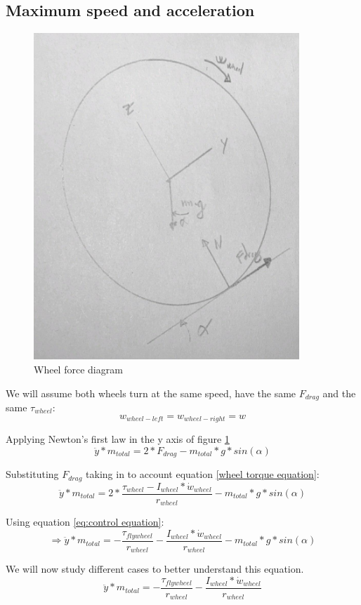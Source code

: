 \subsection{Maximum speed and acceleration}
\begin{figure}
	\centering
	\includegraphics[width=10cm]{img/wheel_diagram_drag.jpg}
	\caption{Wheel force diagram}
	\label{fig:Wheel forward force diagram}
\end{figure}
We will assume both wheels turn at the same speed, have the same $F_{drag}$ and the same $\tau_{wheel}$:
\[ w_{wheel-left} = w_{wheel-right} = w \]

Applying Newton's first law in the y axis of figure \ref{fig:Wheel forward force diagram}
\[\ddot{y}*m_{total} = 2 * F_{drag} - m_{total} * g * sin(\alpha)\]

Substituting $F_{drag}$ taking in to account equation \ref{wheel torque equation}:
\[\ddot{y}*m_{total} = 2 * \frac{\tau_{wheel} - I_{wheel} * \dot{w}_{wheel}}{r_{wheel}} - m_{total} * g * sin(\alpha)\]

Using equation \ref{eq:control equation}:
\[\Rightarrow  \ddot{y}*m_{total} = - \frac{\tau_{flywheel}}{r_{wheel}} - \frac{I_{wheel} * \dot{w}_{wheel}}{r_{wheel}} - m_{total} * g * sin(\alpha)\]


We will now study different cases to better understand this equation.
\[\ddot{y}*m_{total} = - \frac{\tau_{flywheel}}{r_{wheel}} - \frac{I_{wheel} * \dot{w}_{wheel}}{r_{wheel}}\]
